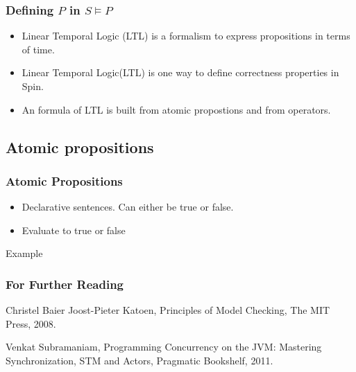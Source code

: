 \documentclass{beamer}
\begin{document}
\begin{frame}
  \frametitle{Defining $P$ in $S \models P$}
  
  \begin{itemize}
    \item Linear Temporal Logic (LTL) is a formalism to express propositions in terms of time.
  \item  Linear Temporal Logic(LTL) is one way to define correctness properties in Spin.
  \item An formula of LTL is built from atomic propostions and from operators.
  \end{itemize}

\end{frame}

\subsection{Atomic propositions}


\begin{frame}
  \frametitle{Atomic Propositions}
  \begin{itemize}
  \item Declarative sentences. Can either be true or false.
  \item Evaluate to true or false
  \end{itemize}
  \begin{block}{Example}
    
  \end{block}
\end{frame}

\begin{frame}
  \frametitle{For Further Reading}

  \begin{thebibliography}{Subramaniam, 2011}

Christel Baier Joost-Pieter Katoen,
Principles of Model Checking,
The MIT Press,
2008.

Venkat Subramaniam,
Programming Concurrency on the JVM: Mastering Synchronization, STM and Actors,
Pragmatic Bookshelf,
2011.

\end{thebibliography}
\end{frame}
\end{document}
